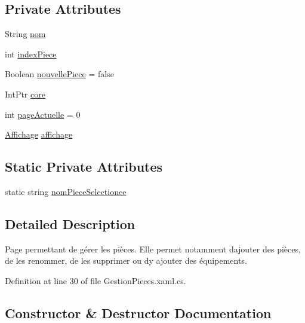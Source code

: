 \subsection*{Private Attributes}
\begin{DoxyCompactItemize}
\item 
String \hyperlink{class_my_domotik_1_1_gestion_pieces_ac20f326e4fe968c5b11c113c54410d43}{nom}
\item 
int \hyperlink{class_my_domotik_1_1_gestion_pieces_a3081b3a9bd790362ccede15eea02219e}{index\+Piece}
\item 
Boolean \hyperlink{class_my_domotik_1_1_gestion_pieces_ac4e1473aa5f93f19af5e8ba2bcfd084d}{nouvelle\+Piece} = false
\item 
Int\+Ptr \hyperlink{class_my_domotik_1_1_gestion_pieces_ac0413c01cf25731dce9798e61902127f}{core}
\item 
int \hyperlink{class_my_domotik_1_1_gestion_pieces_ad0c0449ca20cb4a76fc9d94dbe0a9791}{page\+Actuelle} = 0
\item 
\hyperlink{class_my_domotik_1_1_affichage}{Affichage} \hyperlink{class_my_domotik_1_1_gestion_pieces_a8b682065001015d7e8f9aed32eda4fd9}{affichage}
\end{DoxyCompactItemize}
\subsection*{Static Private Attributes}
\begin{DoxyCompactItemize}
\item 
static string \hyperlink{class_my_domotik_1_1_gestion_pieces_a8a57be0f9bbf50e26f5d2719e8f877d0}{nom\+Piece\+Selectionee}
\end{DoxyCompactItemize}


\subsection{Detailed Description}
Page permettant de gérer les pièces. Elle permet notamment d\textquotesingle{}ajouter des pièces, de les renommer, de les supprimer ou d\textquotesingle{}y ajouter des équipements. 



Definition at line 30 of file Gestion\+Pieces.\+xaml.\+cs.



\subsection{Constructor \& Destructor Documentation}
